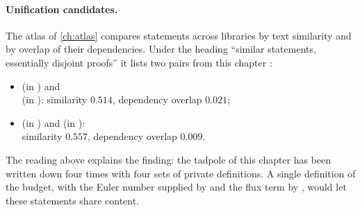 \paragraph{Unification candidates.} The atlas of \cref{ch:atlas} compares statements across
libraries by text similarity and by overlap of their dependencies. Under the heading
``similar statements, essentially disjoint proofs'' it lists two pairs from this chapter
:
\begin{itemize}[leftmargin=2em,nosep]
\item {} (in ) and
 \\ (in ): similarity $0.514$,
 dependency overlap $0.021$;
\item {} (in ) and 
 (in ):\\ similarity $0.557$, dependency overlap $0.009$.
\end{itemize}
The reading
above explains the finding: the tadpole of this chapter has been written down four times with
four sets of private definitions. A single definition of the budget, with the Euler number
supplied by  and the flux term by , would let these
statements share content.

